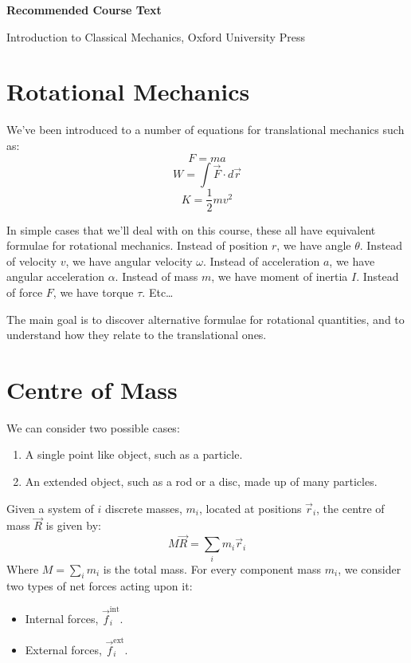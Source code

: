 
\begin{tcolorbox}
    \textbf{Recommended Course Text}

    \vspace{2mm}

    Introduction to Classical Mechanics, Oxford University Press
\end{tcolorbox}

\section{Rotational Mechanics}
We've been introduced to a number of equations for translational mechanics such as:
\[
    F = ma
\]
\[
    W = \int \vec{F} \cdot d\vec{r}
\]
\[
    K = \frac{1}{2}mv^2
\]

In simple cases that we'll deal with on this course, these all have equivalent formulae for rotational mechanics. Instead of position $r$, we have angle $\theta$. Instead of velocity $v$, we have angular velocity $\omega$. Instead of acceleration $a$, we have angular acceleration $\alpha$. Instead of mass $m$, we have moment of inertia $I$. Instead of force $F$, we have torque $\tau$. Etc\dots

The main goal is to discover alternative formulae for rotational quantities, and to understand how they relate to the translational ones.

\section{Centre of Mass}
We can consider two possible cases:
\begin{enumerate}
    \item A single point like object, such as a particle.
    \item An extended object, such as a rod or a disc, made up of many particles.
\end{enumerate}

Given a system of $i$ discrete masses, $m_i$, located at positions $\vec{r}_i$, the centre of mass $\vec{R}$ is given by:
\[
    M \vec{R} = \sum_i m_i \vec{r}_i    
\]  
Where $M = \sum_i m_i$ is the total mass. For every component mass $m_i$, we consider two types of net forces acting upon it:
\begin{itemize}
    \item Internal forces, $\vec{f}_i^\text{int}$.
    \item External forces, $\vec{f}_i^\text{ext}$.
\end{itemize}

